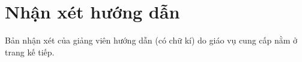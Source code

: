 \chapter*{Nhận xét hướng dẫn}
\label{thanks}

Bản nhận xét của giảng viên hướng dẫn (có chữ kí) do giáo vụ cung cấp nằm ở trang kế tiếp.
